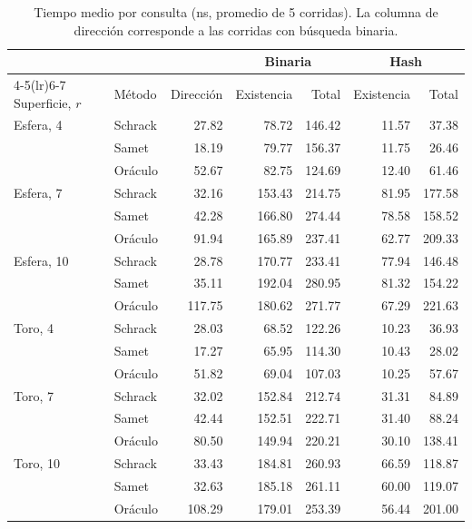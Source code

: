 \begin{table}[htbp]
\centering
\caption{Tiempo medio por consulta (ns, promedio de 5 corridas). La columna de
dirección corresponde a las corridas con búsqueda binaria.}
\label{tab:obj2_tiempos}
\begin{tabular}{llrrrrr}
\toprule
 & & & \multicolumn{2}{c}{Binaria} & \multicolumn{2}{c}{Hash} \\
\cmidrule(lr){4-5}\cmidrule(lr){6-7}
Superficie, $r$ & Método & Dirección & Existencia & Total & Existencia & Total \\
\midrule
Esfera, 4  & Schrack &  27.82 &  78.72 & 146.42 & 11.57 &  37.38 \\
           & Samet   &  18.19 &  79.77 & 156.37 & 11.75 &  26.46 \\
           & Oráculo &  52.67 &  82.75 & 124.69 & 12.40 &  61.46 \\
Esfera, 7  & Schrack &  32.16 & 153.43 & 214.75 & 81.95 & 177.58 \\
           & Samet   &  42.28 & 166.80 & 274.44 & 78.58 & 158.52 \\
           & Oráculo &  91.94 & 165.89 & 237.41 & 62.77 & 209.33 \\
Esfera, 10 & Schrack &  28.78 & 170.77 & 233.41 & 77.94 & 146.48 \\
           & Samet   &  35.11 & 192.04 & 280.95 & 81.32 & 154.22 \\
           & Oráculo & 117.75 & 180.62 & 271.77 & 67.29 & 221.63 \\
\midrule
Toro, 4    & Schrack &  28.03 &  68.52 & 122.26 & 10.23 &  36.93 \\
           & Samet   &  17.27 &  65.95 & 114.30 & 10.43 &  28.02 \\
           & Oráculo &  51.82 &  69.04 & 107.03 & 10.25 &  57.67 \\
Toro, 7    & Schrack &  32.02 & 152.84 & 212.74 & 31.31 &  84.89 \\
           & Samet   &  42.44 & 152.51 & 222.71 & 31.40 &  88.24 \\
           & Oráculo &  80.50 & 149.94 & 220.21 & 30.10 & 138.41 \\
Toro, 10   & Schrack &  33.43 & 184.81 & 260.93 & 66.59 & 118.87 \\
           & Samet   &  32.63 & 185.18 & 261.11 & 60.00 & 119.07 \\
           & Oráculo & 108.29 & 179.01 & 253.39 & 56.44 & 201.00 \\
\bottomrule
\end{tabular}
\end{table}


